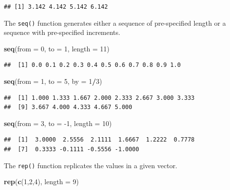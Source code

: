 \documentclass[
]{krantz}
\newenvironment{Shaded}{\begin{snugshade}}{\end{snugshade}}
\newcommand{\DataTypeTok}[1]{\textcolor[rgb]{0.13,0.29,0.53}{#1}}
\newcommand{\DecValTok}[1]{\textcolor[rgb]{0.00,0.00,0.81}{#1}}
\newcommand{\KeywordTok}[1]{\textcolor[rgb]{0.13,0.29,0.53}{\textbf{#1}}}
\newcommand{\NormalTok}[1]{#1}
\newcommand{\OperatorTok}[1]{\textcolor[rgb]{0.81,0.36,0.00}{\textbf{#1}}}
\begin{document}
\begin{verbatim}
## [1] 3.142 4.142 5.142 6.142
\end{verbatim}

The \texttt{seq()} function generates either a sequence of pre-specified length or a sequence with pre-specified increments.

\begin{Shaded}
\begin{Highlighting}[]
\KeywordTok{seq}\NormalTok{(}\DataTypeTok{from =} \DecValTok{0}\NormalTok{, }\DataTypeTok{to =} \DecValTok{1}\NormalTok{, }\DataTypeTok{length =} \DecValTok{11}\NormalTok{)}
\end{Highlighting}
\end{Shaded}

\begin{verbatim}
##  [1] 0.0 0.1 0.2 0.3 0.4 0.5 0.6 0.7 0.8 0.9 1.0
\end{verbatim}

\begin{Shaded}
\begin{Highlighting}[]
\KeywordTok{seq}\NormalTok{(}\DataTypeTok{from =} \DecValTok{1}\NormalTok{, }\DataTypeTok{to =} \DecValTok{5}\NormalTok{, }\DataTypeTok{by =} \DecValTok{1}\OperatorTok{/}\DecValTok{3}\NormalTok{)}
\end{Highlighting}
\end{Shaded}

\begin{verbatim}
##  [1] 1.000 1.333 1.667 2.000 2.333 2.667 3.000 3.333
##  [9] 3.667 4.000 4.333 4.667 5.000
\end{verbatim}

\begin{Shaded}
\begin{Highlighting}[]
\KeywordTok{seq}\NormalTok{(}\DataTypeTok{from =} \DecValTok{3}\NormalTok{, }\DataTypeTok{to =} \DecValTok{{-}1}\NormalTok{, }\DataTypeTok{length =} \DecValTok{10}\NormalTok{)}
\end{Highlighting}
\end{Shaded}

\begin{verbatim}
##  [1]  3.0000  2.5556  2.1111  1.6667  1.2222  0.7778
##  [7]  0.3333 -0.1111 -0.5556 -1.0000
\end{verbatim}

The \texttt{rep()} function replicates the values in a given vector.

\begin{Shaded}
\begin{Highlighting}[]
\KeywordTok{rep}\NormalTok{(}\KeywordTok{c}\NormalTok{(}\DecValTok{1}\NormalTok{,}\DecValTok{2}\NormalTok{,}\DecValTok{4}\NormalTok{), }\DataTypeTok{length =} \DecValTok{9}\NormalTok{)}
\end{Highlighting}
\end{Shaded}
\end{document}
